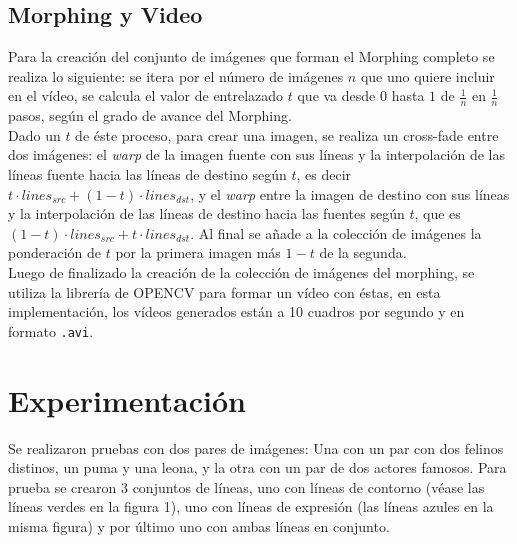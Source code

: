 \documentclass[conference]{IEEEtran}
\begin{document}
	\subsection*{Morphing y Video}
	Para la creación del conjunto de imágenes que forman el Morphing completo se realiza lo siguiente: se itera por el número de imágenes $n$ que uno quiere incluir en el vídeo, se calcula el valor de entrelazado $t$ que va desde $0$ hasta $1$ de $\frac{1}{n}$ en $\frac{1}{n}$ pasos, según el grado de avance del Morphing. \\
	Dado un $t$ de éste proceso, para crear una imagen, se realiza un cross-fade entre dos imágenes: el \textit{warp} de la imagen fuente con sus líneas y la interpolación de las líneas fuente hacia las líneas de destino según $t$, es decir $t \cdot lines_{src} + (1 - t) \cdot lines_{dst}$, y el \textit{warp} entre la imagen de destino con sus líneas y la interpolación de las líneas de destino hacia las fuentes según $t$, que es $(1 - t) \cdot lines_{src} + t \cdot lines_{dst}$. Al final se añade a la colección de imágenes la ponderación de $t$ por la primera imagen más $1 - t$ de la segunda. \\
	
	Luego de finalizado la creación de la colección de imágenes del morphing, se utiliza la librería de OPENCV para formar un vídeo con éstas, en esta implementación, los vídeos generados están a 10 cuadros por segundo y en formato \texttt{.avi}.


\section*{Experimentación}
	Se realizaron pruebas con dos pares de imágenes: Una con un par con dos felinos distinos, un puma y una leona, y la otra con un par de dos actores famosos. Para prueba se crearon 3 conjuntos de líneas, uno con líneas de contorno (véase las líneas verdes en la figura 1), uno con líneas de expresión (las líneas azules en la misma figura) y por último uno con ambas líneas en conjunto.
	
\end{document}
